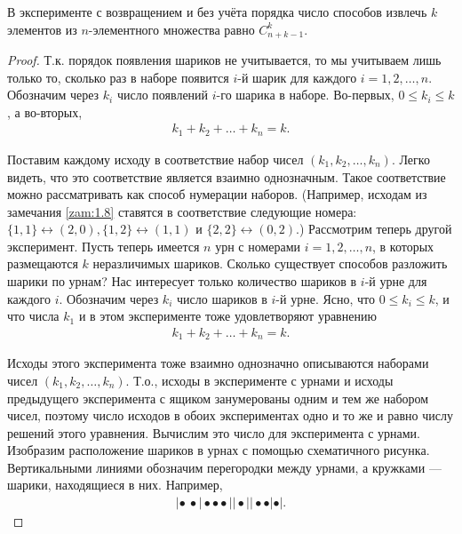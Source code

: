 \begin{theorem}
\label{th:1.9}
В эксперименте с возвращением и без учёта порядка число
способов извлечь $k$ элементов из $n$-элементного множества равно $C^k_{n+k-1}$.
\end{theorem}
\begin{proof}
Т.к. порядок появления шариков не учитывается, то мы
учитываем лишь только то, сколько раз в наборе появится $i$-й шарик для
каждого $i = 1, 2,\dots, n$. Обозначим через $k_i$ число появлений $i$-го шарика в
наборе. Во-первых, $0 \leqslant k_i \leqslant k$, а во-вторых,
\begin{gather*}
k_1+k_2+\dots+k_n=k.
\end{gather*}

Поставим каждому исходу в соответствие набор чисел $(k_1, k_2,\dots, k_n)$.
Легко видеть, что это соответствие является взаимно однозначным. Такое соответствие можно рассматривать как способ нумерации наборов. (Например,
исходам из замечания \ref{zam:1.8} ставятся в соответствие следующие номера:
$\{1, 1\} \leftrightarrow (2, 0), 
\{1, 2\} \leftrightarrow (1, 1) \text{ и } 
\{2, 2\} \leftrightarrow (0, 2).$)
Рассмотрим теперь другой эксперимент. Пусть теперь имеется $n$ урн с
номерами $i = 1, 2,\dots, n$, в которых размещаются $k$ неразличимых шариков.
Сколько существует способов разложить шарики по урнам? Нас интересует
только количество шариков в $i$-й урне для каждого $i$. Обозначим через $k_i$
число шариков в $i$-й урне. Ясно, что $0 \leqslant k_i \leqslant k$, и что числа $k_1$ и в этом
эксперименте тоже удовлетворяют уравнению
\begin{gather*}
k_1+k_2+\dots+k_n=k.
\end{gather*}

Исходы этого эксперимента тоже взаимно однозначно описываются наборами
чисел \newline $(k_1, k_2,\dots, k_n)$. Т.о., исходы в эксперименте с урнами и исходы предыдущего эксперимента с ящиком занумерованы одним и тем же набором чисел,
поэтому число исходов в обоих экспериментах одно и то же и равно числу
решений этого уравнения. Вычислим это число для эксперимента с урнами.
Изобразим расположение шариков в урнах с помощью схематичного рисунка. Вертикальными линиями обозначим перегородки между урнами, а
кружками — шарики, находящиеся в них. Например,
\begin{gather*}
\left|\bullet\ \bullet\right|\bullet\bullet\bullet||\bullet||\bullet\bullet|\bullet|.
\end{gather*}


\end{proof}
